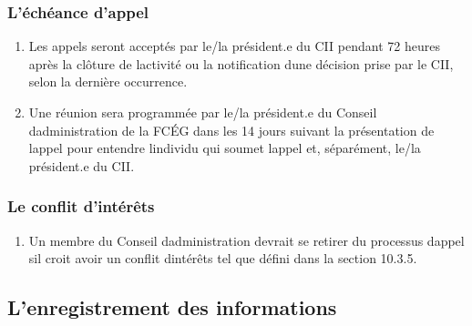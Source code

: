 \subsubsection{L'échéance d'appel}
\label{l-echeance-d-appel}

\begin{enumerate}
 \item
  Les appels seront acceptés par le/la président.e du CII pendant 72 heures après la clôture de l\textquotesingle activité ou la notification d\textquotesingle une décision prise par le CII, selon la dernière occurrence.
 \item
  Une réunion sera programmée par le/la président.e du Conseil d\textquotesingle administration de la FCÉG dans les 14 jours suivant la présentation de l\textquotesingle appel pour entendre l\textquotesingle individu qui soumet l\textquotesingle appel et, séparément, le/la président.e du CII.
\end{enumerate}

\subsubsection{Le conflit d'intérêts}
\label{le-conflit-d-interets}

\begin{enumerate}
 \item
  Un membre du Conseil d\textquotesingle administration devrait se retirer du processus d\textquotesingle appel s\textquotesingle il croit avoir un conflit d\textquotesingle intérêts tel que défini dans la section 10.3.5.
\end{enumerate}

\subsection{L'enregistrement des informations}
\label{lenregistrement-des-informations}

